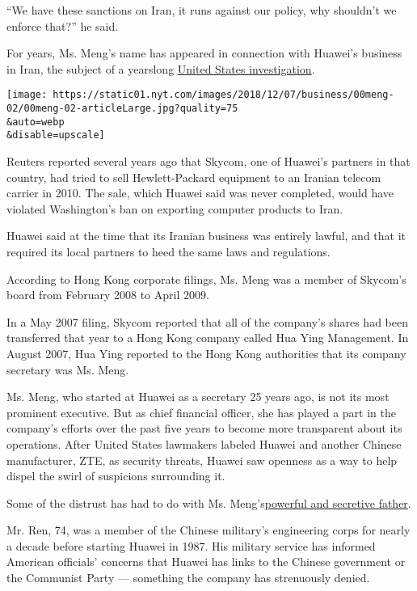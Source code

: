 ``We have these sanctions on Iran, it runs against our policy, why
shouldn't we enforce that?'' he said.

For years, Ms. Meng's name has appeared in connection with Huawei's
business in Iran, the subject of a yearslong
\href{https://www.nytimes.com/2017/04/26/business/huawei-investigation-sanctions-subpoena.html}{United
States investigation}.

\texttt{[image: https://static01.nyt.com/images/2018/12/07/business/00meng-02/00meng-02-articleLarge.jpg?quality=75\\\&auto=webp\\\&disable=upscale]}

Reuters reported several years ago that Skycom, one of Huawei's partners
in that country, had tried to sell Hewlett-Packard equipment to an
Iranian telecom carrier in 2010. The sale, which Huawei said was never
completed, would have violated Washington's ban on exporting computer
products to Iran.

Huawei said at the time that its Iranian business was entirely lawful,
and that it required its local partners to heed the same laws and
regulations.

According to Hong Kong corporate filings, Ms. Meng was a member of
Skycom's board from February 2008 to April 2009.

In a May 2007 filing, Skycom reported that all of the company's shares
had been transferred that year to a Hong Kong company called Hua Ying
Management. In August 2007, Hua Ying reported to the Hong Kong
authorities that its company secretary was Ms. Meng.

Ms. Meng, who started at Huawei as a secretary 25 years ago, is not its
most prominent executive. But as chief financial officer, she has played
a part in the company's efforts over the past five years to become more
transparent about its operations. After United States lawmakers labeled
Huawei and another Chinese manufacturer, ZTE, as security threats,
Huawei saw openness as a way to help dispel the swirl of suspicions
surrounding it.

Some of the distrust has had to do with Ms.
Meng's\href{https://www.nytimes.com/2013/04/18/technology/succession-at-huawei-offers-glimpse-into-secretive-firm.html}{powerful
and secretive father}.

Mr. Ren, 74, was a member of the Chinese military's engineering corps
for nearly a decade before starting Huawei in 1987. His military service
has informed American officials' concerns that Huawei has links to the
Chinese government or the Communist Party --- something the company has
strenuously denied.

